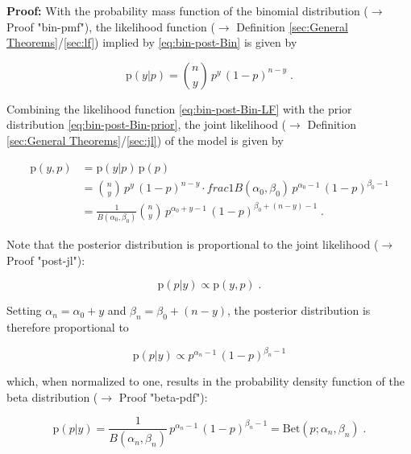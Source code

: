 \documentclass[a4paper,12pt]{book}
\begin{document}
\vspace{1em}
\textbf{Proof:} With the probability mass function of the binomial distribution ($\rightarrow$ Proof "bin-pmf"), the likelihood function ($\rightarrow$ Definition \ref{sec:General Theorems}/\ref{sec:lf}) implied by \eqref{eq:bin-post-Bin} is given by

\begin{equation} \label{eq:bin-post-Bin-LF}
\mathrm{p}(y|p) = {n \choose y} \, p^y \, (1-p)^{n-y} \; .
\end{equation}

Combining the likelihood function \eqref{eq:bin-post-Bin-LF} with the prior distribution \eqref{eq:bin-post-Bin-prior}, the joint likelihood ($\rightarrow$ Definition \ref{sec:General Theorems}/\ref{sec:jl}) of the model is given by

\begin{equation} \label{eq:bin-post-Bin-JL}
\begin{split}
\mathrm{p}(y,p) &= \mathrm{p}(y|p) \, \mathrm{p}(p) \\
&= {n \choose y} \, p^y \, (1-p)^{n-y} \cdot frac{1}{B(\alpha_0,\beta_0)} \, p^{\alpha_0-1} \, (1-p)^{\beta_0-1} \\
&= \frac{1}{B(\alpha_0,\beta_0)} {n \choose y} \, p^{\alpha_0+y-1} \, (1-p)^{\beta_0+(n-y)-1} \; .
\end{split}
\end{equation}

Note that the posterior distribution is proportional to the joint likelihood ($\rightarrow$ Proof "post-jl"):

\begin{equation} \label{eq:bin-post-Bin-post-s1}
\mathrm{p}(p|y) \propto \mathrm{p}(y,p) \; .
\end{equation}

Setting $\alpha_n = \alpha_0 + y$ and $\beta_n = \beta_0 + (n-y)$, the posterior distribution is therefore proportional to

\begin{equation} \label{eq:bin-post-Bin-post-s2}
\mathrm{p}(p|y) \propto p^{\alpha_n-1} \, (1-p)^{\beta_n-1}
\end{equation}

which, when normalized to one, results in the probability density function of the beta distribution ($\rightarrow$ Proof "beta-pdf"):

\begin{equation} \label{eq:bin-post-Bin-post-qed}
\mathrm{p}(p|y) = \frac{1}{B(\alpha_n,\beta_n)} \, p^{\alpha_n-1} \, (1-p)^{\beta_n-1} = \mathrm{Bet}(p; \alpha_n, \beta_n) \; .
\end{equation}
\end{document}
